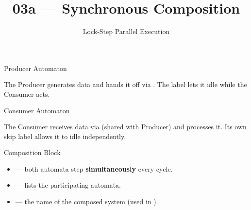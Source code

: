 

\title{03a --- Synchronous Composition}
\subtitle{Lock-Step Parallel Execution}



\maketitle

\begin{frame}[fragile]{Producer Automaton}
  

  \medskip
  The Producer generates data and hands it off via .
  The  label lets it idle while the Consumer acts.
\end{frame}

\begin{frame}[fragile]{Consumer Automaton}
  

  \medskip
  The Consumer receives data via  (shared with Producer) and processes it.
  Its own skip label  allows it to idle independently.
\end{frame}

\begin{frame}[fragile]{Composition Block}
  

  \bigskip
  \begin{itemize}
    \item {} --- both automata step \textbf{simultaneously} every cycle.
    \item {} --- lists the participating automata.
    \item {} --- the name of the composed system (used in ).
  \end{itemize}
\end{frame}

